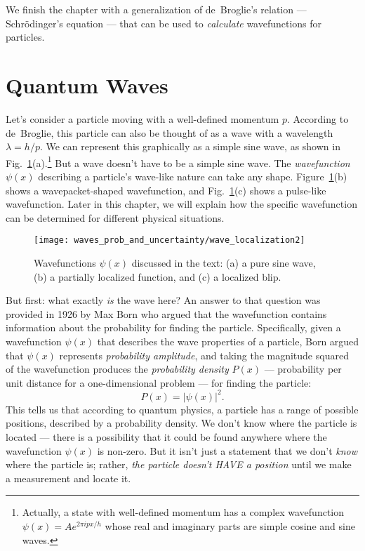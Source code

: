 We finish the chapter with a generalization of de~Broglie's relation --- 
Schr\"odinger's equation --- that can be used to \textit{calculate} 
wavefunctions for particles.

\section{Quantum Waves}
\label{sec:quantum_waves}

Let's consider a particle moving with a well-defined momentum
$p$. According to de~Broglie, this particle can also be
thought of as a wave with a wavelength $\lambda = h/p$. We can
represent this graphically as a simple sine wave, as shown in
Fig.~\ref{fig:wave_localization}(a).\footnote{Actually, a state with
well-defined momentum has a complex wavefunction $\psi(x) = Ae^{2\pi
ipx/h}$ whose real and imaginary parts are simple cosine and sine waves.}
But a wave doesn't have to be a simple sine wave. The {\it wavefunction}
$\psi(x)$ describing a particle's wave-like nature can take any shape.
Figure~\ref{fig:wave_localization}(b) shows a wavepacket-shaped
wavefunction, and Fig.~\ref{fig:wave_localization}(c) shows a pulse-like
wavefunction. Later in this chapter, we will explain how the specific
wavefunction can be determined for different physical situations.

\begin{figure}
\begin{center}
\texttt{[image: waves\_prob\_and\_uncertainty/wave\_localization2]}
\caption{Wavefunctions $\psi(x)$ discussed in the text: (a) a pure
sine wave, (b) a partially localized function, and (c) a localized blip.}
\label{fig:wave_localization}
\end{center}
\end{figure}

But first: what exactly {\it is} the wave here? An answer to that
question was provided in 1926 by Max Born who argued that the wavefunction
contains information about the probability for finding the particle.
Specifically, given a wavefunction $\psi(x)$ that describes the
wave properties of a particle, Born argued that $\psi(x)$ represents
\textit{probability amplitude}, and taking the magnitude squared of
the wavefunction produces the \textit{probability density} $P(x)$ ---
probability per unit distance for a one-dimensional problem --- for
finding the particle:
\begin{equation}
P(x) = |\psi(x)|^2.
\label{eq:probdensity}
\end{equation}
This tells us that according to quantum physics, a particle has a range
of possible positions, described by a probability density. We don't know
where the particle is located --- there is a possibility that it could
be found anywhere where the wavefunction $\psi(x)$ is non-zero. But it
isn't just a statement that we don't {\it know} where the particle is;
rather, {\it the particle doesn't HAVE a position} until we make a
measurement and locate it.

